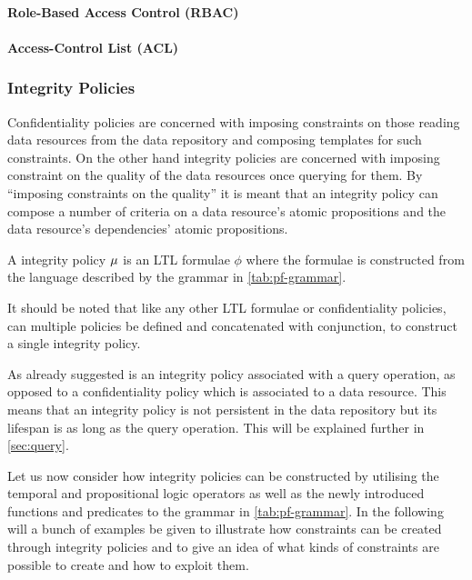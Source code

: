 \paragraph{Role-Based Access Control (RBAC)}
\paragraph{Access-Control List (ACL)}

\subsubsection{Integrity Policies}
Confidentiality policies are concerned with imposing constraints on those reading data resources from the data repository and composing templates for such constraints. On the other hand integrity policies are concerned with imposing constraint on the quality of the data resources once querying for them. By ``imposing constraints on the quality'' it is meant that an integrity policy can compose a number of criteria on a data resource's atomic propositions and the data resource's dependencies' atomic propositions.
\begin{definition}\label{def:ip}
A integrity policy $\mu$ is an LTL formulae $\phi$ where the formulae is constructed from the language described by the grammar in \autoref{tab:pf-grammar}.
\end{definition}
It should be noted that like any other LTL formulae or confidentiality policies, can multiple policies be defined and concatenated with conjunction, to construct a single integrity policy.

As already suggested is an integrity policy associated with a query operation, as opposed to a confidentiality policy which is associated to a data resource. This means that an integrity policy is not persistent in the data repository but its lifespan is as long as the query operation. This will be explained further in \autoref{sec:query}.

Let us now consider how integrity policies can be constructed by utilising the temporal and propositional logic operators as well as the newly introduced functions and predicates to the grammar in \autoref{tab:pf-grammar}. In the following will a bunch of examples be given to illustrate how constraints can be created through integrity policies and to give an idea of what kinds of constraints are possible to create and how to exploit them.

